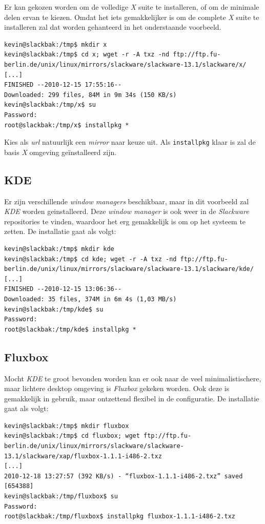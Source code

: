Er kan gekozen worden om de volledige \emph{X} suite te installeren, of om de minimale delen ervan te kiezen. Omdat het iets gemakkelijker is om de complete \emph{X} suite te installeren zal dat worden gehanteerd in het onderstaande voorbeeld. 
\begin{lstlisting}
kevin@slackbak:/tmp$ mkdir x
kevin@slackbak:/tmp$ cd x; wget -r -A txz -nd ftp://ftp.fu-berlin.de/unix/linux/mirrors/slackware/slackware-13.1/slackware/x/
[...]
FINISHED --2010-12-15 17:55:16--
Downloaded: 299 files, 84M in 9m 34s (150 KB/s)
kevin@slackbak:/tmp/x$ su
Password: 
root@slackbak:/tmp/x$ installpkg *
\end{lstlisting}%
Kies als \emph{url} natuurlijk een \emph{mirror} naar keuze uit. Als \texttt{installpkg} klaar is zal de basis \emph{X} omgeving ge\"{i}nstalleerd zijn. 

\subsection{KDE}
Er zijn verschillende \emph{window managers} beschikbaar, maar in dit voorbeeld zal \emph{KDE} worden geinstalleerd. Deze \emph{window manager} is ook weer in de \emph{Slackware} repositories te vinden, waardoor het erg gemakkelijk is om op het systeem te zetten. De installatie gaat als volgt:
\begin{lstlisting}
kevin@slackbak:/tmp$ mkdir kde
kevin@slackbak:/tmp$ cd kde; wget -r -A txz -nd ftp://ftp.fu-berlin.de/unix/linux/mirrors/slackware/slackware-13.1/slackware/kde/
[...]
FINISHED --2010-12-15 13:06:36--
Downloaded: 35 files, 374M in 6m 4s (1,03 MB/s)
kevin@slackbak:/tmp/kde$ su
Password: 
root@slackbak:/tmp/kde$ installpkg *
\end{lstlisting}

\subsection{Fluxbox}
Mocht \emph{KDE} te groot bevonden worden kan er ook naar de veel minimalistischere, maar lichtere desktop omgeving is \emph{Fluxbox} gekeken worden. Ook deze is gemakkelijk in gebruik, maar ontzettend flexibel in de configuratie. De installatie gaat als volgt:
\begin{lstlisting}
kevin@slackbak:/tmp$ mkdir fluxbox
kevin@slackbak:/tmp$ cd fluxbox; wget ftp://ftp.fu-berlin.de/unix/linux/mirrors/slackware/slackware-13.1/slackware/xap/fluxbox-1.1.1-i486-2.txz
[...]
2010-12-18 13:27:57 (392 KB/s) - “fluxbox-1.1.1-i486-2.txz” saved [654388]
kevin@slackbak:/tmp/fluxbox$ su
Password: 
root@slackbak:/tmp/fluxbox$ installpkg fluxbox-1.1.1-i486-2.txz
\end{lstlisting}

